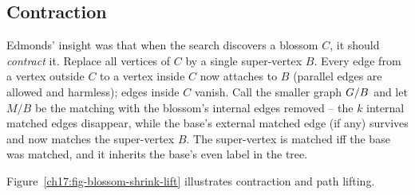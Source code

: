 \subsection{Contraction}

Edmonds' insight was that when the search discovers a blossom $C$, it should \emph{contract} it. Replace all vertices of
$C$ by a single super-vertex $B$. Every edge from a vertex outside $C$ to a vertex inside $C$ now
attaches to $B$ (parallel edges are allowed and harmless); edges inside $C$ vanish. Call the smaller graph
$G/B$ and let $M/B$ be the matching with the blossom's internal edges removed -- the $k$ internal
matched edges disappear, while the base's external matched edge (if any) survives and now matches the
super-vertex $B$. The super-vertex is matched iff the base was matched, and it inherits the base's
even label in the tree.

Figure~\ref{ch17:fig-blossom-shrink-lift} illustrates contraction and path lifting.

